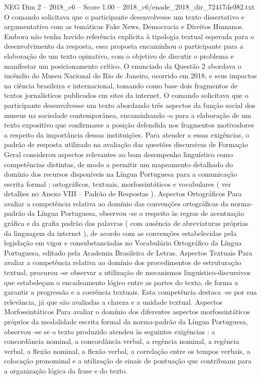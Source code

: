 \begin{textsample}{NEG Dim 2 – 2018\_c6 – Score 1.00 – 2018\_c6/enade\_2018\_dir\_72417de982.txt}
O comando solicitava que o participante desenvolvesse um texto dissertativo e argumentativo com as temáticas Fake News, Democracia e Direitos Humanos.
Embora não tenha havido referência explícita à tipologia textual esperada para o desenvolvimento da resposta, essa proposta encaminhou o participante para a elaboração de um texto opinativo, com o objetivo de discutir o problema e manifestar um posicionamento crítico.
O enunciado da Questão 2 abordava o incêndio do Museu Nacional do Rio de Janeiro, ocorrido em 2018, e seus impactos na ciência brasileira e internacional, tomando como base dois fragmentos de textos jornalísticos publicados em sites da internet.
O comando solicitava que o participante desenvolvesse um texto abordando três aspectos da função social dos museus na sociedade contemporânea, encaminhando -o para a elaboração de um texto expositivo que confirmasse a posição defendida nos fragmentos motivadores a respeito da importância dessas instituições.
Para atender a essas exigências, o padrão de resposta utilizado na avaliação das questões discursivas de Formação Geral considerou aspectos relevantes ao bom desempenho linguístico como competências distintas, de modo a permitir um mapeamento detalhado do domínio dos recursos disponíveis na Língua Portuguesa para a comunicação escrita formal : ortográficos, textuais, morfossintáticos e vocabulares ( ver detalhes no Anexo VIII – Padrão de Respostas ).
Aspectos Ortográficos Para avaliar a competência relativa ao domínio das convenções ortográficas da norma-padrão da Língua Portuguesa, observou -se o respeito às regras de acentuação gráfica e da grafia padrão das palavras ( com ausência de abreviaturas próprias da linguagem da internet ), de acordo com as convenções estabelecidas pela legislação em vigor e consubstanciadas no Vocabulário Ortográfico da Língua Portuguesa, editado pela Academia Brasileira de Letras.
Aspectos Textuais Para avaliar a competência relativa ao domínio dos procedimentos de estruturação textual, procurou -se observar a utilização de mecanismos linguístico-discursivos que estabeleçam o encadeamento lógico entre as partes do texto, de forma a garantir a progressão e a coerência textuais.
Esta competência destaca -se por sua relevância, já que são avaliadas a clareza e a unidade textual.
Aspectos Morfossintáticos Para avaliar o domínio dos diferentes aspectos morfossintáticos próprios da modalidade escrita formal da norma-padrão da Língua Portuguesa, observou -se se o texto produzido atendeu às seguintes exigências : a concordância nominal, a concordância verbal, a regência nominal, a regência verbal, a flexão nominal, a flexão verbal, a correlação entre os tempos verbais, a colocação pronominal e a utilização de sinais de pontuação que contribuam para a organização lógica da frase e do texto.

\end{textsample}
